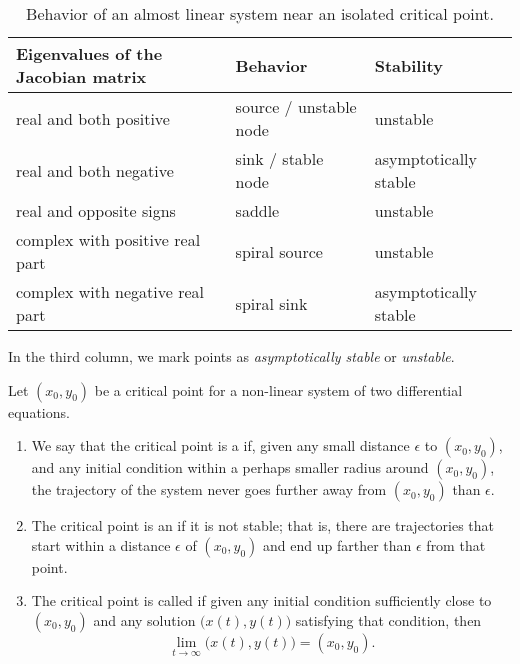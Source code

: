 \documentclass{ximera}
\begin{document}
\begin{table}[h!t]
    \mybeginframe
    \capstart
    \begin{center}
        \begin{tabular}{@{}lll@{}}
            \toprule
            Eigenvalues of the Jacobian matrix & Behavior & Stability \\
            \midrule
            real and both positive & source / unstable node & unstable \\
            real and both negative & sink / stable node & asymptotically stable \\
            real and opposite signs & saddle & unstable \\
            complex with positive real part & spiral source & unstable \\
            complex with negative real part & spiral sink & asymptotically stable \\
            \bottomrule
        \end{tabular}
    \end{center}
    \caption{Behavior of an almost linear system near an isolated critical point.  \label{pln:behtab2}}
    \myendframe
\end{table}

In the third column, we mark points as \emph{asymptotically stable} or \emph{unstable}.  
\begin{definition}
    Let $(x_0, y_0)$ be a critical point for a non-linear system of two differential equations.
    \begin{enumerate}
        \item We say that the critical point is a \emph{} if, given any small distance $\epsilon$ to $(x_0,y_0)$, and any initial condition within a perhaps smaller radius around $(x_0,y_0)$, the trajectory of the system never goes further away from $(x_0,y_0)$ than $\epsilon$.
        \item The critical point is an \emph{} if it is not stable; that is, there are trajectories that start within a distance $\epsilon$ of $(x_0, y_0)$ and end up farther than $\epsilon$ from that point.
        \item The critical point is called \emph{} if given any initial condition sufficiently close to $(x_0,y_0)$ and any solution $\bigl( x(t), y(t) \bigr)$ satisfying that condition, then
        \begin{equation*}
            \lim_{t \to \infty} \bigl( x(t), y(t) \bigr) = (x_0,y_0) .
        \end{equation*}
    \end{enumerate}
\end{definition}
\end{document}
